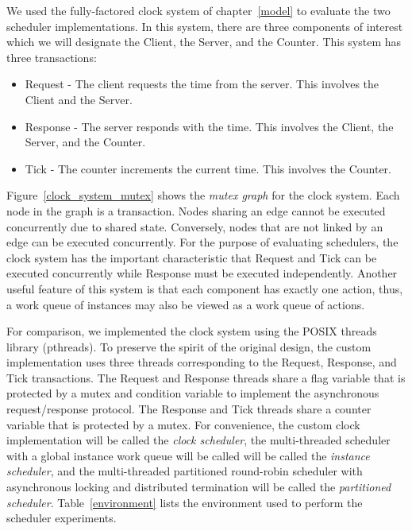 We used the fully-factored clock system of chapter~\ref{model} to evaluate the two scheduler implementations.
In this system, there are three components of interest which we will designate the Client, the Server, and the Counter.
This system has three transactions:
\begin{itemize}
  \item Request - The client requests the time from the server.  This involves the Client and the Server.
  \item Response - The server responds with the time.  This involves the Client, the Server, and the Counter.
  \item Tick - The counter increments the current time.  This involves the Counter.
\end{itemize}
Figure~\ref{clock_system_mutex} shows the \emph{mutex graph} for the clock system.
Each node in the graph is a transaction.
Nodes sharing an edge cannot be executed concurrently due to shared state.
Conversely, nodes that are not linked by an edge can be executed concurrently.
For the purpose of evaluating schedulers, the clock system has the important characteristic that Request and Tick can be executed concurrently while Response must be executed independently.
Another useful feature of this system is that each component has exactly one action, thus, a  work queue of instances may also be viewed as a work queue of actions.

For comparison, we implemented the clock system using the POSIX threads library (pthreads).
To preserve the spirit of the original design, the custom implementation uses three threads corresponding to the Request, Response, and Tick transactions.
The Request and Response threads share a flag variable that is protected by a mutex and condition variable to implement the asynchronous request/response protocol.
The Response and Tick threads share a counter variable that is protected by a mutex.
For convenience, the custom clock implementation will be called the \emph{clock scheduler}, the multi-threaded scheduler with a global instance work queue will be called will be called the \emph{instance scheduler}, and the multi-threaded partitioned  round-robin scheduler with asynchronous locking and distributed termination will be called the \emph{partitioned scheduler}.
Table~\ref{environment} lists the environment used to perform the scheduler experiments.

